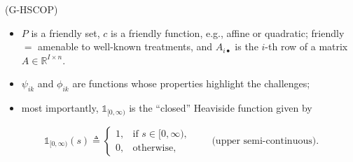 \documentclass[aspectratio=169,11pt]{beamer}
\begin{document}
\begin{frame}[plain,t]
  \vspace{0.02cm}
  {\color{decknavy}\bfseries{}\par}
  {\color{decknavy}\fontsize{14.6}{17.0}\selectfont (G-HSCOP)\par}

  \vspace{0.10cm}
  \begingroup
  \setlength{\fboxsep}{0.20cm}
  \setlength{\fboxrule}{0.45pt}
  \color{deckgray}
  \noindent\fbox{%
    \begin{minipage}{0.94\textwidth}
      \color{decknavy}
      \fontsize{11.2}{13.3}\selectfont
      \vspace{-0.08cm}
      \noindent\resizebox{0.93\linewidth}{!}{$\displaystyle
        \underset{x\in P}{\operatorname{maximize}}\quad
        \Phi(x)\triangleq c(x)+\sum_{k=1}^{K_0}\psi_{0k}(x)
        \underbrace{\mathds{1}_{[0,\infty)}\!\left(\phi_{0k}(x)\right)}_
          {\text{composite indicator fnc.}}
      $}\par
      \vspace{0.08cm}
      \noindent\resizebox{0.96\linewidth}{!}{$\displaystyle
        \operatorname{subject\ to}\quad
        A_{i\bullet}x+\sum_{k=1}^{K_i}\psi_{ik}(x)
        \mathds{1}_{[0,\infty)}\!\left(\phi_{ik}(x)\right)
        \geq \eta_i,\qquad i=1,\ldots,I.
      $}\par
      \vspace{-0.06cm}
    \end{minipage}%
  }
  \endgroup

  \vspace{0.10cm}
  \begin{itemize}
    \setlength{\itemsep}{0.08cm}
    \setlength{\parskip}{0pt}
    \fontsize{10.25}{12.1}\selectfont
    \item $P$ is a \textcolor{red!72!black}{friendly} set, $c$ is a
      \textcolor{red!72!black}{friendly} function, e.g., affine or quadratic;
      \textcolor{red!72!black}{friendly} $=$ amenable to well-known treatments,
      and $A_{i\bullet}$ is the $i$-th row of a matrix
      $A\in\mathbb{R}^{I\times n}$.
    \item $\psi_{ik}$ and $\phi_{ik}$ are functions whose properties highlight
      the challenges;
    \item most importantly, $\mathds{1}_{[0,\infty)}$ is the ``closed''
      Heaviside function given by
  \end{itemize}

  \vspace{-0.17cm}
  {\color{decknavy}\fontsize{10.5}{12.3}\selectfont
  \[
    \mathds{1}_{[0,\infty)}(s)\triangleq
    \begin{cases}
      1, & \text{if }s\in[0,\infty),\\
      0, & \text{otherwise},
    \end{cases}
    \qquad\text{(upper semi-continuous).}
  \]
  }
\end{frame}
\end{document}
